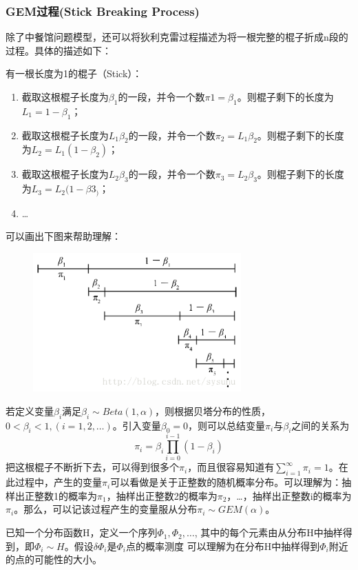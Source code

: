 \documentclass[a4paper,twoside]{article}
\theoremstyle{definition} \newtheorem{law}[thm]{Law}
\theoremstyle{plain} \newtheorem{jury}[thm]{Jury}
\theoremstyle{remark} \newtheorem*{marg}{Margaret}
\begin{document}
\subsubsection*{GEM过程(Stick Breaking Process)}
除了中餐馆问题模型，还可以将狄利克雷过程描述为将一根完整的棍子折成n段的过程。具体的描述如下：

有一根长度为1的棍子（Stick）：
\begin{enumerate}
    \item 截取这根棍子长度为$\beta_1$的一段，并令一个数$\pi1=\beta_1$。则棍子剩下的长度为$L_1=1−\beta_1$；
    \item 截取这根棍子长度为$L_1\beta_2$的一段，并令一个数$\pi_2=L_1\beta_2$。则棍子剩下的长度为$L_2=L_1(1−\beta_2)$；
    \item 截取这根棍子长度为$L_2\beta_3$的一段，并令一个数$\pi_3=L_2\beta_3$。则棍子剩下的长度为$L_3=L_2(1−\beta3_)$；
    \item \dots
\end{enumerate}
可以画出下图来帮助理解：
\begin{figure}[H]
    \centering
    \includegraphics[width=8cm]{JLU_bachelor/appendix_fig/sticks.png}
    \label{fig:sticks}
\end{figure}

若定义变量$\beta_i$满足$\beta_i\sim Beta(1,\alpha)$，则根据贝塔分布的性质，$0<\beta_i<1,(i=1,2,\dots)$。引入变量$\beta_0=0$，则可以总结变量$\pi_i$与$\beta_i$之间的关系为
$$
\pi_{i}=\beta_{i} \prod_{i=0}^{i-1}\left(1-\beta_{i}\right)
$$
把这根棍子不断折下去，可以得到很多个$\pi_i$，而且很容易知道有$\sum_{i=1}^{\infty} \pi_{i}=1$。在此过程中，产生的变量$\pi_i$可以看做是关于正整数的随机概率分布。可以理解为：抽样出正整数1的概率为$\pi_1$，抽样出正整数2的概率为$\pi_2$，\dots，抽样出正整数i的概率为$\pi_i$。那么，可以记该过程产生的变量服从分布$\pi_i \sim GEM(\alpha)$。

已知一个分布函数H，定义一个序列$\Phi_1,\Phi_2,\dots$,
其中的每个元素由从分布H中抽样得到，即$\Phi_i \sim H$。假设$\delta \Phi_i$是$\Phi_i$点的概率测度
可以理解为在分布H中抽样得到$\Phi_i$附近的点的可能性的大小。
\end{document}
